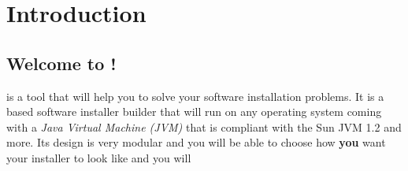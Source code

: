 \chapter*{Introduction}

\section*{Welcome to \IzPack !}

\IzPack is a tool that will help you to solve your software installation
problems. It is a \Java based software installer builder that will run on any
operating system coming with a \textit{Java Virtual Machine (JVM)} that is
compliant with the Sun JVM 1.2 and more. Its design is very modular and you will
be able to choose how \textbf{you} want your installer to look like and you will
